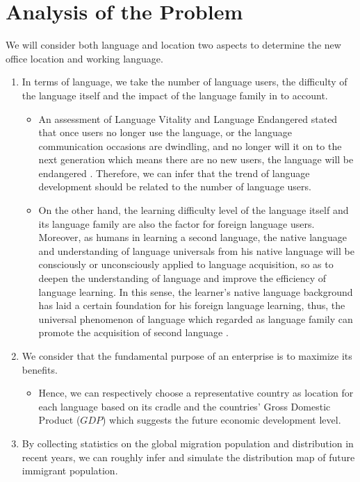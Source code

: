 \documentclass{mcmthesis}
\begin{document}
\section{Analysis of the Problem}
We will consider both language and location two aspects to determine the new office location and working language.
\begin{enumerate}
  \itemsep-0.5em
  \item In terms of language, we take the number of language users, the difficulty of the language itself and the impact of the language family in to account.

  \begin{itemize}
  \item An assessment of Language Vitality and Language Endangered stated that once users no longer use the language, or the language communication occasions are dwindling, and no longer will it on to the next generation which means there are no new users, the language will be endangered \cite{3}. Therefore, we can infer that the trend of language development should be related to the number of language users.
  \item On the other hand, the learning difficulty level of the language itself and its language family are also the factor for foreign language users. Moreover, as humans in learning a second language, the native language and understanding of language universals from his native language will be consciously or unconsciously applied to language acquisition, so as to deepen the understanding of language and improve the efficiency of language learning. In this sense, the learner's native language background has laid a certain foundation for his foreign language learning, thus, the universal phenomenon of language which regarded as language family can promote the acquisition of second language \cite{4}.
  \end{itemize}
  \item We consider that the fundamental purpose of an enterprise is to maximize its benefits.
  \begin{itemize}
  \item Hence, we can respectively choose a representative country as location for each language based on its cradle and the countries’ Gross Domestic Product ($GDP$) which suggests the future economic development level.
  \end{itemize}
  \item By collecting statistics on the global migration population and distribution in recent years, we can roughly infer and simulate the distribution map of future immigrant population.
\end{enumerate}
\end{document}
